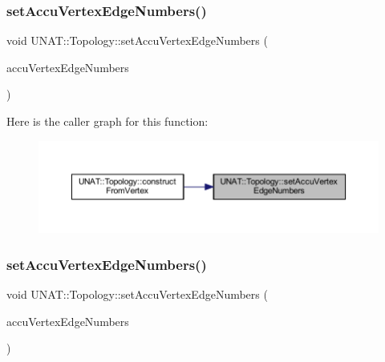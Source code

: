 \subsubsection{\texorpdfstring{setAccuVertexEdgeNumbers()}{setAccuVertexEdgeNumbers()}\hspace{0.1cm}{\footnotesize\ttfamily [2/3]}}
{\footnotesize\ttfamily void U\+N\+A\+T\+::\+Topology\+::set\+Accu\+Vertex\+Edge\+Numbers (\begin{DoxyParamCaption}\item[{\mbox{\hyperlink{include_2swMacro_8h_a113cf5f6b5377cdf3fac6aa4e443e9aa}{sw\+Int}} $\ast$}]{accu\+Vertex\+Edge\+Numbers }\end{DoxyParamCaption})\hspace{0.3cm}{\ttfamily [inline]}}

Here is the caller graph for this function\+:
\nopagebreak
\begin{figure}[H]
\begin{center}
\leavevmode
\includegraphics[width=350pt]{classUNAT_1_1Topology_a06ea506a220c6eb45a6beb4106aa0dbc_icgraph}
\end{center}
\end{figure}
\mbox{\label{classUNAT_1_1Topology_a06ea506a220c6eb45a6beb4106aa0dbc}} 
\subsubsection{\texorpdfstring{setAccuVertexEdgeNumbers()}{setAccuVertexEdgeNumbers()}\hspace{0.1cm}{\footnotesize\ttfamily [3/3]}}
{\footnotesize\ttfamily void U\+N\+A\+T\+::\+Topology\+::set\+Accu\+Vertex\+Edge\+Numbers (\begin{DoxyParamCaption}\item[{\mbox{\hyperlink{include_2swMacro_8h_a113cf5f6b5377cdf3fac6aa4e443e9aa}{sw\+Int}} $\ast$}]{accu\+Vertex\+Edge\+Numbers }\end{DoxyParamCaption})\hspace{0.3cm}{\ttfamily [inline]}}

